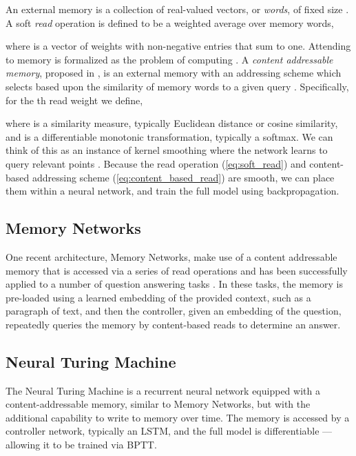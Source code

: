 \documentclass{article}
\begin{document}
An external memory  is a collection of  real-valued vectors, or \textit{words}, of fixed size . A soft \textit{read} operation is defined to be a weighted average over memory words,

where  is a vector of weights with non-negative entries that sum to one. Attending to memory is formalized as the problem of computing . A \textit{content addressable memory}, proposed in \cite{graves2014neural,weston2014memory,bahdanau2014neural,sukhbaatar2015end}, is an external memory with an addressing scheme which selects  based upon the similarity of memory words to a given query . Specifically, for the th read weight  we define,

where  is a similarity measure, typically Euclidean distance or cosine similarity, and  is a differentiable monotonic transformation, typically a softmax. We can think of this as an instance of kernel smoothing where the network learns to query relevant points .
Because the read operation (\ref{eq:soft_read}) and content-based addressing scheme (\ref{eq:content_based_read}) are smooth, we can place them within a neural network, and train the full model using backpropagation.





\subsection{Memory Networks}

One recent architecture, Memory Networks, make use of a content addressable memory that is accessed via a series of read operations \cite{weston2014memory,sukhbaatar2015end} and has been successfully applied to a number of question answering tasks \cite{weston2015towards,hill2015goldilocks}. In these tasks, the memory is pre-loaded using a learned embedding of the provided context, such as a paragraph of text, and then the controller, given an embedding of the question, repeatedly queries the memory by content-based reads to determine an answer.





\subsection{Neural Turing Machine}

The Neural Turing Machine is a recurrent neural network equipped with a content-addressable memory, similar to Memory Networks, but with the additional capability to write to memory over time. The memory is accessed by a controller network, typically  an LSTM, and the full model is differentiable --- allowing it to be trained via BPTT.
\end{document}
